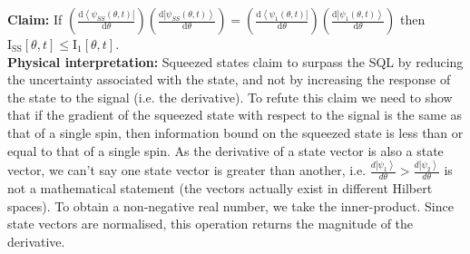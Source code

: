 \documentclass[reqno]{amsart}
\newcommand{\ket}[1]{\left| #1 \right>}
\newcommand{\bra}[1]{\left< #1 \right|}
\def\funcwrt#1#2#3{\mathrm{#1}_{\mathrm{#3}}\left[#2\right]}
\begin{document}
\textbf{Claim:} If $\left(\frac{\mathrm{d}\bra{\psi_{SS}(\theta,t)}}{\mathrm{d} \theta}\right)\left(\frac{\mathrm{d}\ket{\psi_{SS}(\theta,t)}}{\mathrm{d} \theta}\right) = \left(\frac{\mathrm{d}\bra{\psi_1(\theta,t)}}{\mathrm{d} \theta}\right)\left(\frac{\mathrm{d}\ket{\psi_1(\theta,t)}}{\mathrm{d} \theta}\right)$ then $\funcwrt{I}{\theta,t}{SS} \leq \funcwrt{I}{\theta,t}{1}$.\\

\textbf{Physical interpretation:} Squeezed states claim to surpass the SQL by reducing the uncertainty associated with the state, and not by increasing the response of the state to the signal (i.e. the derivative). To refute this claim we need to show that if the gradient of the squeezed state with respect to the signal is the same as that of a single spin, then information bound on the squeezed state is less than or equal to that of a single spin. As the derivative of a state vector is also a state vector, we can't say one state vector is greater than another, i.e. $\frac{d\ket{\psi_1}}{d\theta} > \frac{d\ket{\psi_2}}{d\theta}$ is not a mathematical statement (the vectors actually exist in different Hilbert spaces). To obtain a non-negative real number, we take the inner-product. Since state vectors are normalised, this operation returns the magnitude of the derivative.\\
\end{document}
